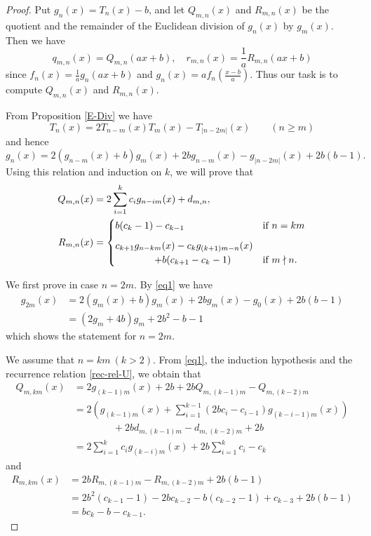 \documentclass[a4paper, 11pt]{amsart}
\numberwithin{equation}{section}
\theoremstyle{definition}
\begin{document}
\begin{proof}
Put $g_n(x)=T_n(x)-b$, and let $Q_{m,n}(x)$ and $R_{m,n}(x)$ be the quotient and  the remainder of the Euclidean division of $g_n(x)$ by $g_m(x)$.
Then we have
\[
q_{m,n}(x)=Q_{m,n}(ax+b),\quad r_{m,n}(x)=\frac1a R_{m,n}(ax+b)
\]
since $f_n(x)=\frac1a g_n(ax+b)$ and $g_n(x)=af_n(\frac{x-b}a)$.
Thus our task is to compute $Q_{m,n}(x)$ and $R_{m,n}(x)$.

From Proposition \ref{E-Div} we have 
$$
T_n(x)=2T_{n-m}(x)T_m(x)-T_{|n-2m|}(x) \qquad (n\geq m)
$$
and hence
\begin{equation}\label{eq1}
g_n(x)=2(g_{n-m}(x)+b)g_m(x)+2bg_{n-m}(x)-g_{|n-2m|}(x)+2b(b-1).
\end{equation}
Using this relation and induction on $k$, we will prove that
\begin{align*}
Q_{m,n}(x)&=2\sum_{i=1}^kc_ig_{n-im}(x)+d_{m,n},\\
R_{m,n}(x)
&=
\begin{cases}
b(c_k-1)-c_{k-1}&\text{if}\ n=km\medskip\\
c_{k+1}g_{n-km}(x)-c_kg_{(k+1)m-n}(x)\\
\qquad \qquad +b(c_{k+1}-c_k-1)& \text{if}\ m\nmid n.
\end{cases}
\end{align*}

We first prove in case $n=2m$.
By \eqref{eq1} we have
\begin{align*}
g_{2m}(x)
&=2(g_{m}(x)+b)g_m(x)+2bg_m(x)-g_0(x)+2b(b-1)\\
&=(2g_m+4b)g_m+2b^2-b-1
\end{align*}
which shows the statement for $n=2m.$

We assume that $n=km\ (k>2)$. From \eqref{eq1}, the induction hypothesis and the recurrence relation \eqref{rec-rel-U}, we obtain that
\begin{align*}
Q_{m,km}(x)
&=2g_{(k-1)m}(x)+2b+2bQ_{m,(k-1)m}-Q_{m,(k-2)m}\\
&=2\left( g_{(k-1)m}(x)+\sum_{i=1}^{k-1}(2bc_i-c_{i-1})g_{(k-i-1)m}(x)\right)\\&\qquad \qquad +2bd_{m,(k-1)m}-d_{m,(k-2)m}+2b\\
&=2\sum_{i=1}^kc_ig_{(k-i)m}(x)+2b\sum_{i=1}^kc_i-c_k
\end{align*}
and
\begin{align*}
R_{m,km}(x)
&=2bR_{m,(k-1)m}-R_{m,(k-2)m}+2b(b-1)\\
&=2b^2(c_{k-1}-1)-2bc_{k-2}-b(c_{k-2}-1)+c_{k-3}+2b(b-1)\\
&=bc_k-b-c_{k-1}.
\end{align*}


\end{proof}
\end{document}

